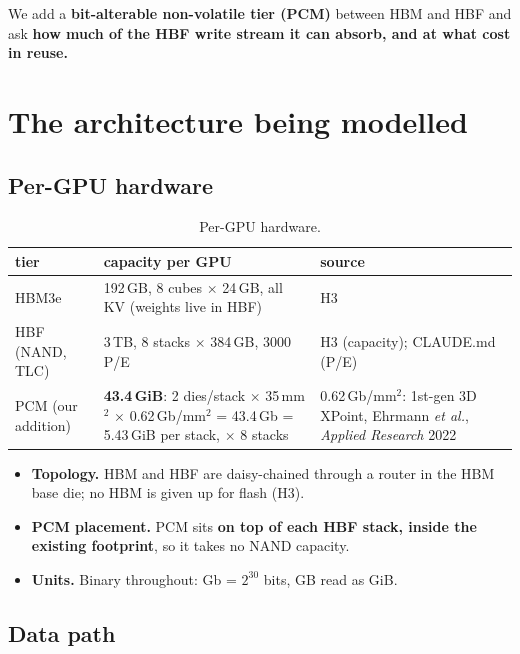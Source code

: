 \documentclass[11pt,a4paper]{article}
\newcommand{\hd}[1]{\textbf{#1}}
\begin{document}
We add a \textbf{bit-alterable non-volatile tier (PCM)} between HBM and HBF
and ask \textbf{how much of the HBF write stream it can absorb, and at what
cost in reuse.}

\section{The architecture being modelled}\label{sec:arch}

\subsection{Per-GPU hardware}

\begin{xltabular}{\linewidth}{@{}P{24mm} Y{1.15} Y{0.85}@{}}
\caption{Per-GPU hardware.}\label{tab:hw}\\
\toprule
\hd{tier} & \hd{capacity per GPU} & \hd{source} \\
\midrule
HBM3e & 192\,GB, 8 cubes $\times$ 24\,GB, all KV (weights live in HBF) & H3~\cite{h3} \\
HBF (NAND, TLC) & 3\,TB, 8 stacks $\times$ 384\,GB, 3000 P/E & H3 (capacity); CLAUDE.md (P/E) \\
PCM (our addition) & \textbf{43.4\,GiB}: 2 dies/stack $\times$ 35\,mm$^2$ $\times$ 0.62\,Gb/mm$^2$ = 43.4\,Gb = 5.43\,GiB per stack, $\times$ 8 stacks
  & 0.62\,Gb/mm$^2$: 1st-gen 3D XPoint, Ehrmann \emph{et al.}, \emph{Applied Research} 2022~\cite{ehrmann2022pcm} \\
\bottomrule
\end{xltabular}

\begin{itemize}
  \item \textbf{Topology.} HBM and HBF are daisy-chained through a router in
    the HBM base die; no HBM is given up for flash (H3).
  \item \textbf{PCM placement.} PCM sits \textbf{on top of each HBF stack,
    inside the existing footprint}, so it takes no NAND capacity.
  \item \textbf{Units.} Binary throughout: Gb = $2^{30}$ bits, GB read as GiB.
\end{itemize}

\subsection{Data path}
\end{document}
